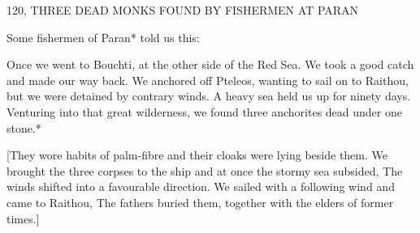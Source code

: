 120, THREE DEAD MONKS FOUND BY FISHERMEN
AT PARAN

Some fishermen of Paran* told us this:

Once we went to Bouchti, at the other side of the Red Sea.
We took
a good catch and made our way back.
We anchored off Pteleos,
wanting to sail on to Raithou, but we were detained by contrary
winds.
A heavy sea held us up for ninety days.
Venturing into that
great wilderness, we found three anchorites dead under one stone.*

[They wore habits of palm-fibre and their cloaks were lying beside
them.
We brought the three corpses to the ship and at once the
stormy sea subsided, The winds shifted into a favourable direction.
We sailed with a following wind and came to Raithou, The fathers
buried them, together with the elders of former times.]

